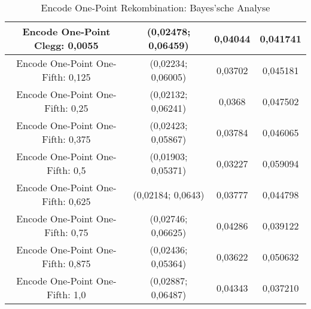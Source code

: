 \begin{table}[H]
\begin{tabular}{c | c | c | c}
		\hline
		Encode One-Point Clegg: 0,0055 & (0,02478; 0,06459) & 0,04044 & 0,041741\\
		\hline
		\hline
		Encode One-Point One-Fifth: 0,125 & (0,02234; 0,06005) & 0,03702 & 0,045181\\
		\hline
		Encode One-Point One-Fifth: 0,25 & (0,02132; 0,06241) & 0,0368 & 0,047502\\
		\hline
		Encode One-Point One-Fifth: 0,375 & \color{Green}(0,02423; 0,05867)\color{black} & 0,03784 & 0,046065\\
		\hline
		Encode One-Point One-Fifth: 0,5 & (0,01903; 0,05371) & \color{Green}0,03227\color{black} & \color{Green}0,059094\color{black}\\
		\hline
		Encode One-Point One-Fifth: 0,625 & \color{red}(0,02184; 0,0643)\color{black} & 0,03777 & 0,044798\\
		\hline
		Encode One-Point One-Fifth: 0,75 & (0,02746; 0,06625) & 0,04286 & 0,039122\\
		\hline
		Encode One-Point One-Fifth: 0,875 & \color{Green}(0,02436; 0,05364)\color{black} & 0,03622 & 0,050632\\
		\hline
		Encode One-Point One-Fifth: 1,0 & (0,02887; 0,06487) & 0,04343 & \color{red}0,037210\color{black}\\
		
	\end{tabular}
	\caption{Encode One-Point Rekombination: Bayes'sche Analyse}
	\label{table:encodeOnePointBayesian}
\end{table}

